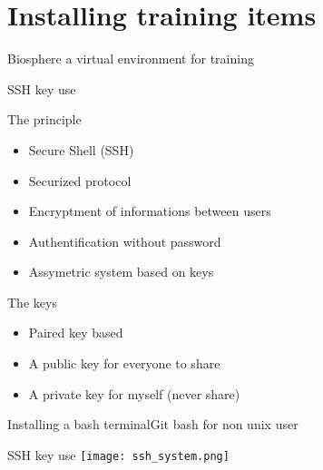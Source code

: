 \section{Installing training items}

\begin{frame}{Biosphere a virtual environment for training}
\end{frame}

\begin{frame}[fragile]{SSH key use}
\begin{block}{The principle}
\begin{itemize}
\item Secure Shell (SSH)
\item Securized protocol
\item Encryptment of informations between users
\item Authentification without password
\item Assymetric system based on keys
\end{itemize}
\end{block}

\begin{block}{The keys}
\begin{itemize}
\item Paired key based
\item A public key for everyone to share
\item A private key for myself (never share)
\end{itemize}
\end{block}
\end{frame}

\begin{frame}{Installing a bash terminal}{Git bash for non unix user}
\end{frame}

\begin{frame}{SSH key use}
\centering\texttt{[image: ssh\_system.png]}
\end{frame}

